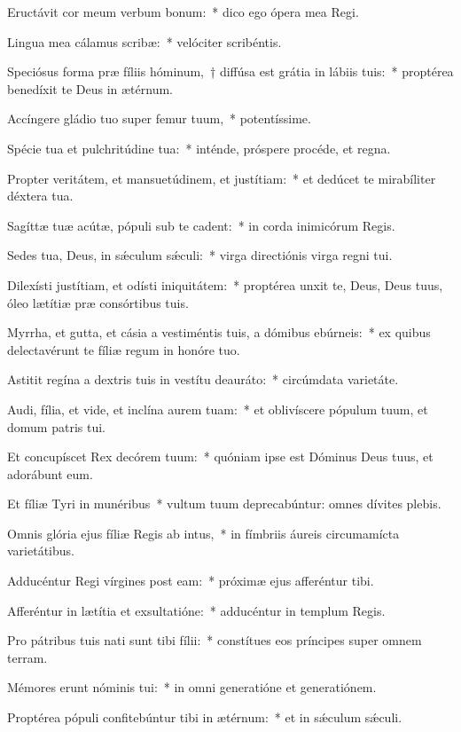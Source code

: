 \item Eructávit cor meum verbum bonum:~* dico ego ópera mea Regi.

\item Lingua mea cálamus scribæ:~* velóciter scribéntis.

\item Speciósus forma præ fíliis hóminum,~† diffúsa est grátia in lábiis tuis:~* proptérea benedíxit te Deus in ætérnum.

\item Accíngere gládio tuo super femur tuum,~* potentíssime.

\item Spécie tua et pulchritúdine tua:~* inténde, próspere procéde, et regna.

\item Propter veritátem, et mansuetúdinem, et justítiam:~* et dedúcet te mirabíliter déxtera tua.

\item Sagíttæ tuæ acútæ, pópuli sub te cadent:~* in corda inimicórum Regis.

\item Sedes tua, Deus, in sǽculum sǽculi:~* virga directiónis virga regni tui.

\item Dilexísti justítiam, et odísti iniquitátem:~* proptérea unxit te, Deus, Deus tuus, óleo lætítiæ præ consórtibus tuis.

\item Myrrha, et gutta, et cásia a vestiméntis tuis, a dómibus ebúrneis:~* ex quibus delectavérunt te fíliæ regum in honóre tuo.

\item Astitit regína a dextris tuis in vestítu deauráto:~* circúmdata varietáte.

\item Audi, fília, et vide, et inclína aurem tuam:~* et oblivíscere pópulum tuum, et domum patris tui.

\item Et concupíscet Rex decórem tuum:~* quóniam ipse est Dóminus Deus tuus, et adorábunt eum.

\item Et fíliæ Tyri in munéribus~* vultum tuum deprecabúntur: omnes dívites plebis.

\item Omnis glória ejus fíliæ Regis ab intus,~* in fímbriis áureis circumamícta varietátibus.

\item Adducéntur Regi vírgines post eam:~* próximæ ejus afferéntur tibi.

\item Afferéntur in lætítia et exsultatióne:~* adducéntur in templum Regis.

\item Pro pátribus tuis nati sunt tibi fílii:~* constítues eos príncipes super omnem terram.

\item Mémores erunt nóminis tui:~* in omni generatióne et generatiónem.

\item Proptérea pópuli confitebúntur tibi in ætérnum:~* et in sǽculum sǽculi.
